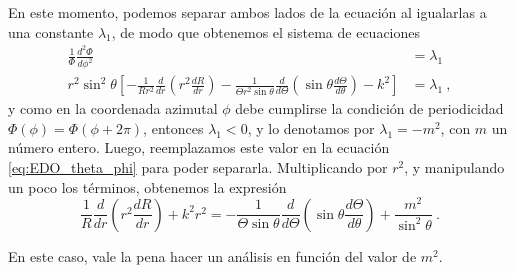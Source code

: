 En este momento, podemos separar ambos lados de la ecuación al igualarlas a una constante $\lambda_1$, de modo que obtenemos el sistema de ecuaciones
\begin{align}
    \frac{1}{\Phi} \frac{d^2\Phi}{d\phi^2} & = \lambda_1 \\
    r^2\sin^2\theta \left[ -\frac{1}{Rr^2} \frac{d}{dr}\left( r^2 \frac{dR}{dr} \right) - \frac{1}{\Theta r^2\sin\theta} \frac{d}{d\Theta} \left( \sin\theta \frac{d\Theta}{d\theta} \right) - k^2 \right] & = \lambda_1 \ , \label{eq:EDO_theta_phi}
\end{align}
y como en la coordenada azimutal $\phi$ debe cumplirse la condición de periodicidad $\Phi(\phi) = \Phi(\phi + 2\pi)$, entonces $\lambda_1<0$, y lo denotamos por $\lambda_1 = -m^2$, con $m$ un número entero. Luego, reemplazamos este valor en la ecuación \eqref{eq:EDO_theta_phi} para poder separarla. Multiplicando por $r^2$, y manipulando un poco los términos, obtenemos la expresión
\begin{equation}
    \frac{1}{R} \frac{d}{dr}\left( r^2 \frac{dR}{dr} \right) + k^2r^2 = - \frac{1}{\Theta\sin\theta} \frac{d}{d\Theta}\left( \sin\theta \frac{d\Theta}{d\theta}\right) + \frac{m^2}{\sin^2\theta} \ .
\end{equation}

En este caso, vale la pena hacer un análisis en función del valor de $m^2$.
